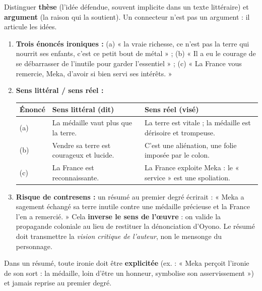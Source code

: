\documentclass[11pt]{article}
\begin{document}
\begin{attention}
Distinguer \textbf{thèse} (l'idée défendue, souvent implicite dans un texte littéraire) et \textbf{argument} (la raison qui la soutient). Un connecteur n'est pas un argument : il articule les idées.
\end{attention}

\begin{corrige}
\begin{enumerate}
    \item \textbf{Trois énoncés ironiques :} (a) « la vraie richesse, ce n'est pas la terre qui nourrit ses enfants, c'est ce petit bout de métal » ; (b) « Il a eu le courage de se débarrasser de l'inutile pour garder l'essentiel » ; (c) « La France vous remercie, Meka, d'avoir si bien servi ses intérêts. »
    \item \textbf{Sens littéral / sens réel :}
    \begin{center}
    \begin{tabularx}{\linewidth}{|X|X|X|}\hline
    \rowcolor{popblueL}\textbf{Énoncé} & \textbf{Sens littéral (dit)} & \textbf{Sens réel (visé)} \\ \hline
    (a) & La médaille vaut plus que la terre. & La terre est vitale ; la médaille est dérisoire et trompeuse. \\ \hline
    (b) & Vendre sa terre est courageux et lucide. & C'est une aliénation, une folie imposée par le colon. \\ \hline
    (c) & La France est reconnaissante. & La France exploite Meka : le « service » est une spoliation. \\ \hline
    \end{tabularx}
    \end{center}
    \item \textbf{Risque de contresens :} un résumé au premier degré écrirait : « Meka a sagement échangé sa terre inutile contre une médaille précieuse et la France l'en a remercié. » Cela \textbf{inverse le sens de l'œuvre} : on valide la propagande coloniale au lieu de restituer la dénonciation d'Oyono. Le résumé doit transmettre la \emph{vision critique de l'auteur}, non le mensonge du personnage.
\end{enumerate}
\end{corrige}

\begin{attention}
Dans un résumé, toute ironie doit être \textbf{explicitée} (ex. : « Meka perçoit l'ironie de son sort : la médaille, loin d'être un honneur, symbolise son asservissement ») et jamais reprise au premier degré.
\end{attention}
\end{document}
